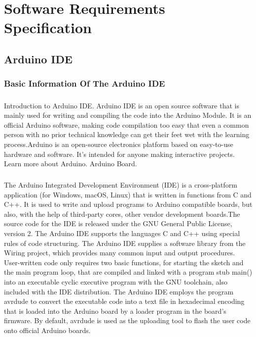 \chapter{Software Requirements Specification}
\section{ Arduino IDE}
\subsection{Basic Information Of The Arduino IDE}
\paragraph{} Introduction to Arduino IDE. Arduino IDE is an open source software that is mainly used for writing and compiling the code into the Arduino Module. It is an official Arduino software, making code compilation too easy that even a common person with no prior technical knowledge can get their feet wet with the learning process.Arduino is an open-source electronics platform based on easy-to-use hardware and software. It's intended for anyone making interactive projects. Learn more about Arduino. Arduino Board.

\large{\paragraph{}The Arduino Integrated Development Environment (IDE) is a cross-platform application (for Windows, macOS, Linux) that is written in functions from C and C++. It is used to write and upload programs to Arduino compatible boards, but also, with the help of third-party cores, other vendor development boards.The source code for the IDE is released under the GNU General Public License, version 2. The Arduino IDE supports the languages C and C++ using special rules of code structuring. The Arduino IDE supplies a software library from the Wiring project, which provides many common input and output procedures. User-written code only requires two basic functions, for starting the sketch and the main program loop, that are compiled and linked with a program stub main() into an executable cyclic executive program with the GNU toolchain, also included with the IDE distribution. The Arduino IDE employs the program avrdude to convert the executable code into a text file in hexadecimal encoding that is loaded into the Arduino board by a loader program in the board's firmware. By default, avrdude is used as the uploading tool to flash the user code onto official Arduino boards.}